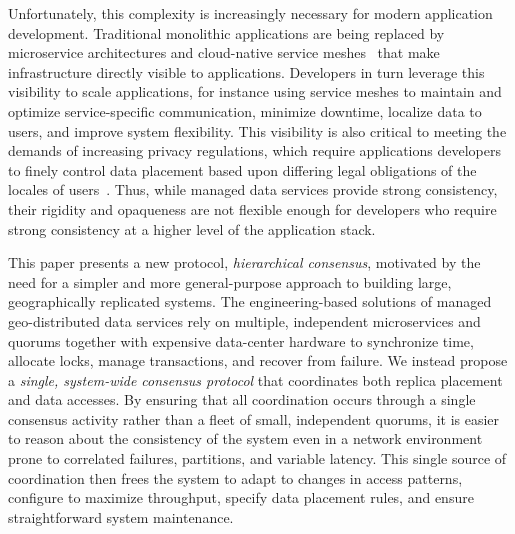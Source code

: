 \documentclass[10pt,conference]{IEEEtran}
\newcommand{\hc}{hierarchical consensus\xspace}
\begin{document}
Unfortunately, this complexity is increasingly necessary for modern application
development.
Traditional monolithic applications are being replaced by microservice architectures
and cloud-native service meshes~\cite{envoy} that make infrastructure directly visible
to applications.
Developers in turn leverage this visibility to scale applications, for instance using
service meshes to maintain and optimize service-specific communication, minimize
downtime, localize data to users, and improve system flexibility.
This visibility is also critical to meeting the demands of increasing privacy
regulations, which require applications developers to finely control data
placement based upon differing legal obligations of the locales of users~\cite{gdpr}.
Thus, while managed data services provide strong consistency, their rigidity and
opaqueness are not flexible enough for developers who require strong consistency
at a higher level of the application stack.

This paper presents a new protocol, \emph{\hc}, motivated by the need for a simpler
and more general-purpose approach to building large, geographically replicated
systems.
The engineering-based solutions of managed geo-distributed data services rely on
multiple, independent microservices and quorums together with expensive data-center
hardware to synchronize time, allocate locks, manage transactions, and recover from
failure.
We instead propose a \emph{single, system-wide consensus protocol} that coordinates both
replica placement and data accesses.
By ensuring that all coordination occurs through a single consensus activity rather
than a fleet of small, independent quorums, it is easier to reason about the
consistency of the system even in a network environment prone to correlated failures,
partitions, and variable latency.
This single source of coordination then frees the system to adapt to changes in access
patterns, configure to maximize throughput, specify data placement rules, and ensure
straightforward system maintenance.
\end{document}
